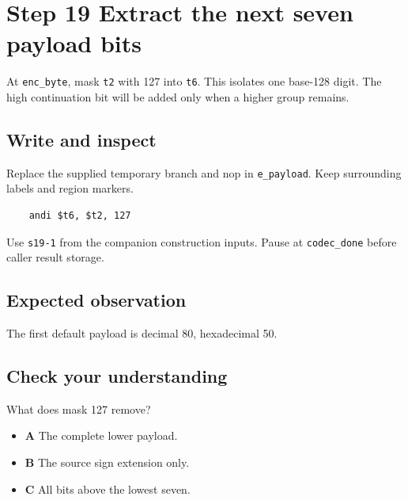 \section{Step 19 Extract the next seven payload bits}\label{delta-s19}

At \texttt{enc\_byte}, mask \texttt{t2} with 127 into \texttt{t6}. This isolates one base-128 digit. The high continuation bit will be added only when a higher group remains.

\subsection{Write and inspect}
Replace the supplied temporary branch and nop in \texttt{e\_payload}. Keep surrounding labels and region markers.

\begin{verbatim}
    andi $t6, $t2, 127
\end{verbatim}
Use \texttt{s19-1} from the companion construction inputs. Pause at \texttt{codec\_done} before caller result storage.

\subsection{Expected observation}
The first default payload is decimal 80, hexadecimal 50.

\subsection{Check your understanding}
What does mask 127 remove?

\begin{itemize}
  \item \textbf{A} The complete lower payload.
  \item \textbf{B} The source sign extension only.
  \item \textbf{C} All bits above the lowest seven.
\end{itemize}
